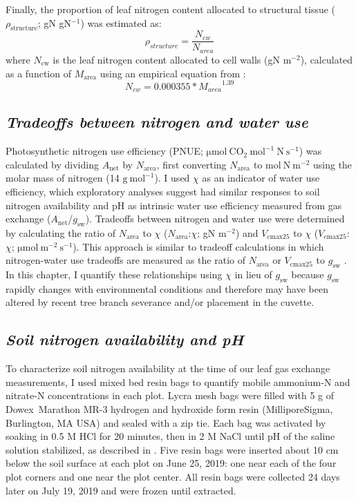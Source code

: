 Finally, the proportion of leaf nitrogen content allocated to structural tissue ($\rho_\mathrm{structure}$; gN gN$^{-1}$) was estimated as:
\begin{equation} \label{eqn_3.11}
    \rho_{structure}=\frac{N_{cw}}{N_{area}}
\end{equation}
\noindent where $N_\mathrm{cw}$ is the leaf nitrogen content allocated to cell walls (gN m$^{-2}$), calculated as a function of $M_\mathrm{area}$ using an empirical equation from :
\begin{equation} \label{eqn_3.12}
    N_{cw}=0.000355*{M_{area}}^{1.39}
\end{equation}


\subsection{\textit{Tradeoffs between nitrogen and water use}}
\noindent Photosynthetic nitrogen use efficiency (PNUE; $\mathrm{\mu mol\ CO_2\ mol^{-1}\ N\ s^{-1}}$) was calculated by dividing $A_\mathrm{net}$ by $N_\mathrm{area}$, first converting $N_\mathrm{area}$ to $\mathrm{mol\ N\ m^{-2}}$ using the molar mass of nitrogen (14 $\mathrm{g\ mol^{-1}}$). I used $\chi$ as an indicator of water use efficiency, which exploratory analyses suggest had similar responses to soil nitrogen availability and pH as intrinsic water use efficiency measured from gas exchange ($A_\mathrm{net}$/$g_\mathrm{sw}$). Tradeoffs between nitrogen and water use were determined by calculating the ratio of $N_\mathrm{area}$ to $\chi$ ($N_\mathrm{area}$:$\chi$; gN m$^{-2}$) and $V_\mathrm{cmax25}$ to $\chi$ ($V_\mathrm{cmax25}$:$\chi$; $\mathrm{\mu mol\ m^{-2}\ s^{-1}}$). This approach is similar to tradeoff calculations in which nitrogen-water use tradeoffs are measured as the ratio of $N_\mathrm{area}$ or $V_\mathrm{cmax25}$ to $g_\mathrm{sw}$ . In this chapter, I quantify these relationships using $\chi$ in lieu of $g_\mathrm{sw}$ because $g_\mathrm{sw}$ rapidly changes with environmental conditions and therefore may have been altered by recent tree branch severance and/or placement in the cuvette.

\subsection{\textit{Soil nitrogen availability and pH}}
\noindent To characterize soil nitrogen availability at the time of our leaf gas exchange measurements, I used mixed bed resin bags to quantify mobile ammonium-N and nitrate-N concentrations in each plot. Lycra mesh bags were filled with 5 g of Dowex\textregistered\ Marathon MR-3 hydrogen and hydroxide form resin (MilliporeSigma, Burlington, MA USA) and sealed with a zip tie. Each bag was activated by soaking in 0.5 M HCl for 20 minutes, then in 2 M NaCl until pH of the saline solution stabilized, as described in . Five resin bags were inserted about 10 cm below the soil surface at each plot on June 25, 2019: one near each of the four plot corners and one near the plot center. All resin bags were collected 24 days later on July 19, 2019 and were frozen until extracted.
    
